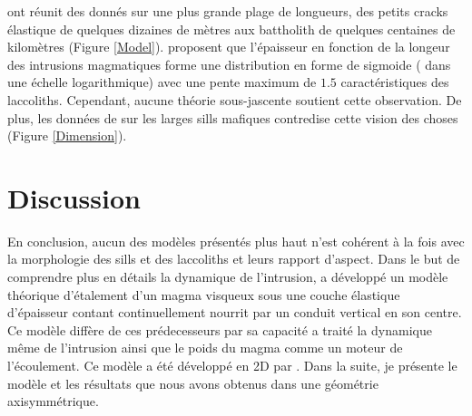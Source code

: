 \citet{Nachwuchskoechin:2002tv}  ont réunit  des donnés  sur une  plus
grande plage  de longueurs,  des petits  cracks élastique  de quelques
dizaines de mètres aux battholith  de quelques centaines de kilomètres
(Figure  \ref{Model}).  \citep{Nachwuchskoechin:2002tv}  proposent que
l'épaisseur en fonction de la longeur des intrusions magmatiques forme
une   distribution  en   forme  de   sigmoide  (   dans  une   échelle
logarithmique) avec  une pente  maximum de $1.5$  caractéristiques des
laccoliths.   Cependant, aucune  théorie sous-jascente  soutient cette
observation. De plus, les données  de \citep{Cruden:tg} sur les larges
sills   mafiques   contredise   cette  vision   des   choses   (Figure
\ref{Dimension}).

\section{Discussion}
\label{sec:discussion}

En conclusion, aucun des modèles  présentés plus haut n'est cohérent à
la  fois avec  la morphologie  des sills  et des  laccoliths et  leurs
rapport  d'aspect.  Dans  le  but  de comprendre  plus  en détails  la
dynamique de l'intrusion, \citet{Michaut:2011kg} a développé un modèle
théorique d'étalement  d'un magma  visqueux sous une  couche élastique
d'épaisseur contant continuellement nourrit par un conduit vertical en
son centre. Ce  modèle diffère de ces prédecesseurs par  sa capacité a
traité la  dynamique même de l'intrusion  ainsi que le poids  du magma
comme un moteur  de l'écoulement. Ce modèle a été  développé en 2D par
\citep{Thorey:2014cv}. Dans  la suite,  je présente  le modèle  et les
résultats que nous avons obtenus dans une géométrie axisymmétrique.





